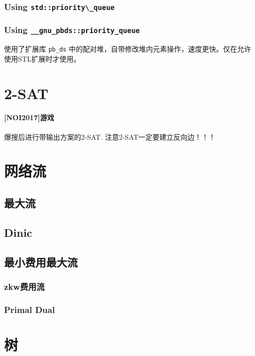 \documentclass{article}
\begin{document}
			\subsubsection{Using \lstinline|std::priority\_queue|}
			
			\subsubsection{Using \lstinline|__gnu_pbds::priority_queue|}
			使用了扩展库 \lstinline|pb_ds| 中的配对堆，自带修改堆内元素操作，速度更快。仅在允许使用STL扩展时才使用。
			

	\section{2-SAT}
		\paragraph{[NOI2017]游戏}
		爆搜后进行带输出方案的2-SAT. 注意2-SAT一定要建立反向边！！！
		
	
	\section{网络流}
		\subsection{最大流}
			\subsection{Dinic}
			

		\subsection{最小费用最大流}
			\subsubsection{zkw费用流}
			
			\subsubsection{Primal Dual}
			
	\newpage

	\section{树}
\end{document}
